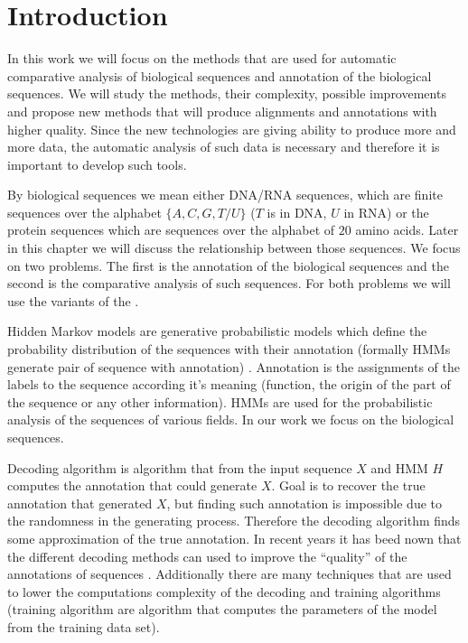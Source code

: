 \chapter{Introduction}


In this work we will focus on the methods that are used for automatic
comparative analysis of biological sequences and annotation of the biological
sequences. We will study the methods, their complexity, possible improvements
and propose new methods that will produce alignments and annotations with higher
quality. Since the new technologies are giving ability to produce more and more
data, the automatic analysis of such data is necessary and therefore it is
important to develop such tools.

By biological sequences we mean either DNA/RNA sequences, which are finite
sequences over the alphabet $\{A,C,G,T/U\}$ ($T$ is in DNA, $U$ in RNA) or the
protein sequences which are sequences over the alphabet of $20$ amino acids.
Later in this chapter we will discuss the relationship between those sequences.
We focus on two problems. The first is the annotation of the biological
sequences and the second is the comparative analysis of such sequences. For both 
problems we will use the variants of the .

Hidden Markov models are generative probabilistic models which define the
probability distribution of the sequences with their annotation (formally HMMs
generate pair of sequence with annotation) \cite{Durbin1998,??}. Annotation is
the assignments of the labels to the sequence according it's meaning (function,
the origin of the part of the sequence or any other information). HMMs are used
for the probabilistic analysis of the sequences of various fields. In our work
we focus on  the biological sequences. 

Decoding algorithm is algorithm that from the input sequence $X$ and HMM $H$
computes the annotation that could generate $X$. Goal is to recover the true
annotation that generated $X$, but finding such annotation is impossible due to
the randomness in the generating process. Therefore the decoding algorithm finds
some approximation of the true annotation.  In recent years it has beed nown
that the different decoding methods can used to improve the ``quality'' of the
annotations of sequences
\cite{Gross2007,Nanasi2010,Nanasi2010mgr,Truszkowski2011}.  Additionally there
are many techniques that are used to lower the computations complexity of the
decoding and training algorithms (training algorithm are algorithm that computes
the parameters of the model from the training data set).

